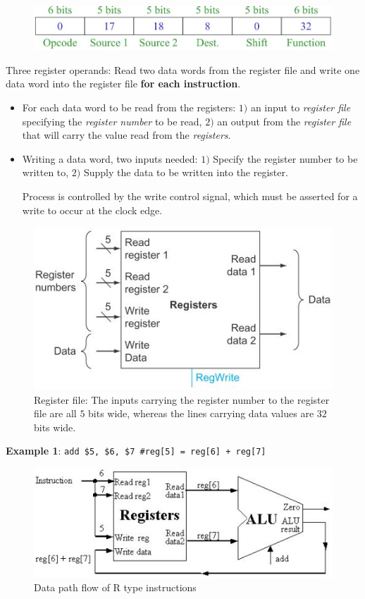 \documentclass[10pt,a4paper]{article}
\begin{document}
\begin{figure} [h!]
    \centering
    \includegraphics[scale=0.5]{R type.JPG}
\end{figure}

Three register operands: Read two data words from the register file and write one data
word into the register file \textbf{for each instruction}.
    \begin{itemize}
        \item For each data word to be read from the registers: $1)$ an input to \textit{register file}
        specifying the \textit{register number} to be read, $2)$ an output from the \textit{register
        file} that will carry the value read from the \textit{registers}.
        \item Writing a data word, two inputs needed: $1)$ Specify the register number to be 
        written to, $2)$ Supply the data to be written into the register. 

        Process is controlled by the write control signal, which must be asserted for a write to occur at the clock edge. 
    \end{itemize}

\begin{figure} [h!]
    \centering
    \includegraphics[scale=0.7]{Register file.JPG}
    \caption{Register file: The inputs carrying the register number to the register file are all $5$ bits wide, whereas the lines carrying data values are $32$ bits wide.}
\end{figure}

\textbf{Example 1}: \texttt{add \$5, \$6, \$7 \#reg[5] = reg[6] + reg[7]}
\begin{figure} [h!]
    \centering
    \includegraphics[scale=0.8]{R type example.JPG}
    \caption{Data path flow of R type instructions}
\end{figure}
\end{document}
